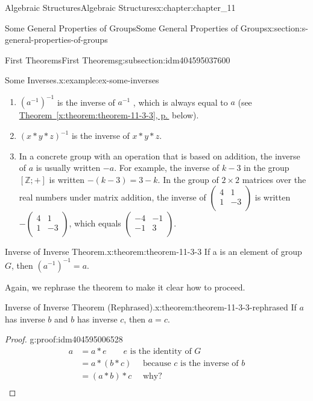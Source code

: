 \documentclass[twoside,10pt,]{book}
\newcommand{\xreffont}{\relax}
\numberwithin{equation}{section}
\begin{document}
\begin{chapterptx}{Algebraic Structures}{}{Algebraic Structures}{}{}{x:chapter:chapter_11}
\begin{sectionptx}{Some General Properties of Groups}{}{Some General Properties of Groups}{}{}{x:section:s-general-properties-of-groups}
\begin{subsectionptx}{First Theorems}{}{First Theorems}{}{}{g:subsection:idm404595037600}
\begin{example}{Some Inverses.}{x:example:ex-some-inverses}
\begin{enumerate}[label=(\alph*)]
\item{}\(\left(a^{-1}\right)^{-1}\) is the inverse of \(a^{-1}\) , which is always equal to \(a\) (see \hyperref[x:theorem:theorem-11-3-3]{Theorem~{\xreffont\ref{x:theorem:theorem-11-3-3}}, p.\,\pageref{x:theorem:theorem-11-3-3}} below).%
\item{}\((x*y*z)^{-1}\) is the inverse of \(x * y * z\).%
\item{}In a concrete group with an operation that is based on addition, the inverse of \(a\) is usually written \(-a\). For example, the inverse of \(k - 3\) in the group \([\mathbb{Z}; +]\) is written \(-(k- 3)=3-k\). In the group of \(2 \times 2 \) matrices over the real numbers under matrix addition, the inverse of \(\left(
\begin{array}{cc}
4 & 1 \\
1 & -3  \\
\end{array}
\right)\) is written \(-\left(
\begin{array}{cc}
4 & 1 \\
1 & -3  \\
\end{array}
\right)\), which equals \(\left(
\begin{array}{cc}
-4 & -1 \\
-1 & 3  \\
\end{array}
\right)\).%
\end{enumerate}
%
\end{example}
\begin{theorem}{Inverse of Inverse Theorem.}{}{x:theorem:theorem-11-3-3}%
If a is an element of group \(G\), then \(\left(a^{-1}\right)^{-1}=a\).%
\end{theorem}
Again, we rephrase the theorem to make it clear how to proceed.%
\begin{theorem}{Inverse of Inverse Theorem (Rephrased).}{}{x:theorem:theorem-11-3-3-rephrased}%
If \(a\) has inverse \(b\) and \(b\) has inverse \(c\), then \(a = c\).%
\end{theorem}
\begin{proof}{}{g:proof:idm404595006528}
%
\begin{equation*}
\begin{split}
a  &=a*e \quad \quad e\textrm{ is the identity of }G\\
&= a * (b * c) \quad\textrm{ because }c\textrm{ is the inverse of } b\\
& = (a * b) * c \quad \textrm{  why?}\\

\end{split}
\end{equation*}
\end{proof}
\end{subsectionptx}
\end{sectionptx}
\end{chapterptx}
\end{document}
